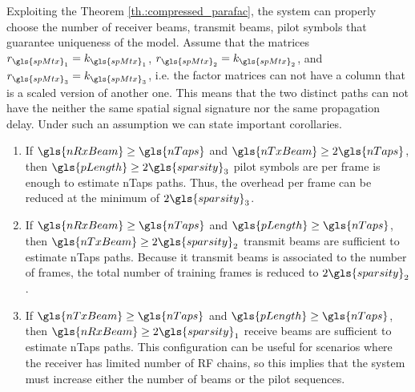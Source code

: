 \documentclass[conference]{IEEEtran}
\begin{document}
Exploiting the Theorem \ref{th.:compressed_parafac}, the system can properly
choose the number of receiver beams, transmit beams, pilot symbols that
guarantee uniqueness of the model. Assume that the matrices $r_{\gls{spMtx}_1}=k_{\gls{spMtx}_1}$,
$r_{\gls{spMtx}_2}=k_{\gls{spMtx}_2}$, and
$r_{\gls{spMtx}_3}=k_{\gls{spMtx}_3}$, i.e. the factor matrices can not have a
column that is a scaled version of another one. This means that the two
distinct paths can not have the neither the
same spatial signal signature nor the same propagation delay.  Under such an
assumption we can state important corollaries.
\begin{enumerate}
\item If $\gls{nRxBeam}\geq\gls{nTaps}$ and   $\gls{nTxBeam}\geq 2\gls{nTaps}$, then
  $\gls{pLength} \geq 2\gls{sparsity}_3$ pilot symbols are per frame is enough to estimate
  \gls{nTaps} paths. Thus, the overhead per frame can be reduced at the minimum
  of $2\gls{sparsity}_3$.
\item If $\gls{nRxBeam} \geq \gls{nTaps}$ and   $\gls{pLength} \geq \gls{nTaps}$, then
  $\gls{nTxBeam} \geq 2\gls{sparsity}_2$ transmit beams are sufficient to estimate
  \gls{nTaps} paths. Because it transmit beams is associated to the number of
  frames, the total number of training frames is reduced to $2\gls{sparsity}_2$.
\item If $\gls{nTxBeam} \geq \gls{nTaps}$ and   $\gls{pLength} \geq \gls{nTaps}$, then
  $\gls{nRxBeam} \geq 2\gls{sparsity}_1$ receive beams are sufficient to estimate
  \gls{nTaps} paths. This configuration can be useful for scenarios where the
  receiver has limited number of \gls{RF} chains, so this implies that the
  system must increase either the number of beams or the pilot sequences.
\end{enumerate}
\end{document}
